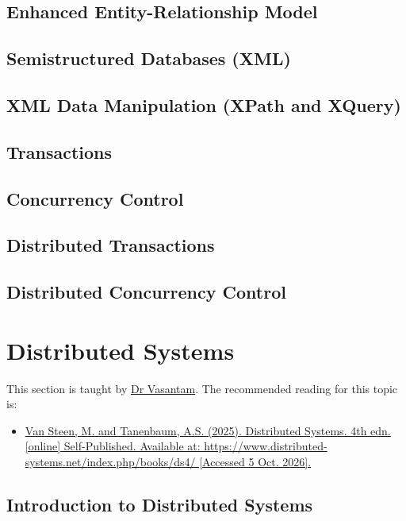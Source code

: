 \subsection{Enhanced Entity-Relationship Model}

\subsection{Semistructured Databases (XML)}

\subsection{XML Data Manipulation (XPath and XQuery)}

\subsection{Transactions}

\subsection{Concurrency Control}

\subsection{Distributed Transactions}

\subsection{Distributed Concurrency Control}

\section{Distributed Systems}

This section is taught by \hyperref[lecturer-thirupathaiahvasantam]{Dr Vasantam}. The recommended reading for this topic is:
\begin{itemize}
    \item \hyperref[cit:Distributed Systems]{Van Steen, M. and Tanenbaum, A.S. (2025). Distributed Systems. 4th edn. [online] Self-Published. Available at: https://www.distributed-systems.net/index.php/books/ds4/ [Accessed 5 Oct. 2026].}
\end{itemize}

\subsection{Introduction to Distributed Systems}


